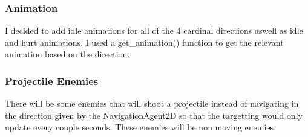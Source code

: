 \documentclass{article}
\begin{document}
        \subsubsection{Animation}
        I decided to add idle animations for all of the 4 cardinal directions aswell as idle and hurt animations. I used a get\_animation() function to get the relevant animation based on the direction.
        \subsubsection{Projectile Enemies}
        There will be some enemies that will shoot a projectile instead of navigating in the direction given by the NavigationAgent2D so that the targetting would only update every couple seconds. These enemies will be non moving enemies.\\
\end{document}

